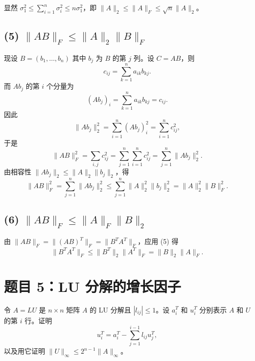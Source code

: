 \documentclass{article}
\begin{document}
\begin{solution}
  显然 $\sigma_1^2 \leq \sum_{i=1}^n \sigma_i^2 \leq n \sigma_1^2$，即
  $\|A\|_2 \leq \|A\|_F \leq \sqrt{n}\|A\|_2$。

  \subsection*{(5) $\|AB\|_F \leq \|A\|_2\|B\|_F$}

  现设 $B = (b_1, \ldots, b_n)$ 其中 $b_j$ 为 $B$ 的第 $j$ 列。设 $C = AB$，则
  \[
    c_{ij} = \sum_{k=1}^n a_{ik} b_{kj}.
  \]
  而 $Ab_j$ 的第 $i$ 个分量为
  \[
    (Ab_j)_i = \sum_{k=1}^n a_{ik} b_{kj} = c_{ij}.
  \]
  因此
  \[
    \|Ab_j\|_2^2 = \sum_{i=1}^n (Ab_j)_i^2 = \sum_{i=1}^n c_{ij}^2,
  \]
  于是
  \[
    \|AB\|_F^2 = \sum_{i,j} c_{ij}^2 = \sum_{j=1}^n \sum_{i=1}^n
    c_{ij}^2 = \sum_{j=1}^n \|Ab_j\|_2^2.
  \]
  由相容性 $\|Ab_j\|_2 \leq \|A\|_2 \|b_j\|_2$，得
  \[
    \|AB\|_F^2 = \sum_{j=1}^n \|Ab_j\|_2^2 \leq \sum_{j=1}^n
    \|A\|_2^2 \|b_j\|_2^2 = \|A\|_2^2 \|B\|_F^2.
  \]

  \subsection*{(6) $\|AB\|_F \leq \|A\|_F\|B\|_2$}

  由 $\|AB\|_F = \|(AB)^T\|_F = \|B^T A^T\|_F$，应用 (5) 得
  \[
    \|B^T A^T\|_F \leq \|B^T\|_2 \|A^T\|_F = \|B\|_2 \|A\|_F.
  \]

\end{solution}

\section{题目 5：LU 分解的增长因子}

令 $A = LU$ 是 $n \times n$ 矩阵 $A$ 的 LU 分解且 $|l_{ij}| \leq 1$。设 $a_i^T$
和 $u_i^T$ 分别表示 $A$ 和 $U$ 的第 $i$ 行。证明
\[
  u_i^T = a_i^T - \sum_{j=1}^{i-1} l_{ij} u_j^T,
\]
以及用它证明 $\|U\|_\infty \leq 2^{n-1}\|A\|_\infty$。
\end{document}
